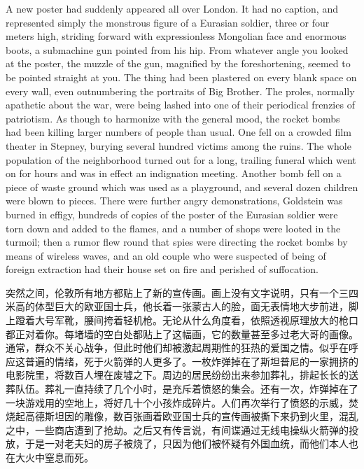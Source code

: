 \begin{paracol}{2}
A new poster had suddenly appeared all over London. It had no caption,
and represented simply the monstrous figure of a Eurasian soldier, three
or four meters high, striding forward with expressionless Mongolian face
and enormous boots, a submachine gun pointed from his hip. From whatever
angle you looked at the poster, the muzzle of the gun, magnified by the
foreshortening, seemed to be pointed straight at you. The thing had been
plastered on every blank space on every wall, even outnumbering the
portraits of Big Brother. The proles, normally apathetic about the war,
were being lashed into one of their periodical frenzies of patriotism.
As though to harmonize with the general mood, the rocket bombs had been
killing larger numbers of people than usual. One fell on a crowded film
theater in Stepney, burying several hundred victims among the ruins. The
whole population of the neighborhood turned out for a long, trailing
funeral which went on for hours and was in effect an indignation
meeting. Another bomb fell on a piece of waste ground which was used as
a playground, and several dozen children were blown to pieces. There
were further angry demonstrations, Goldstein was burned in effigy,
hundreds of copies of the poster of the Eurasian soldier were torn down
and added to the flames, and a number of shops were looted in the
turmoil; then a rumor flew round that spies were directing the rocket
bombs by means of wireless waves, and an old couple who were suspected
of being of foreign extraction had their house set on fire and perished
of suffocation.

\switchcolumn

突然之间，伦敦所有地方都贴上了新的宣传画。画上没有文字说明，只有一个三四米高的体型巨大的欧亚国士兵，他长着一张蒙古人的脸，面无表情地大步前进，脚上蹬着大号军靴，腰间挎着轻机枪。无论从什么角度看，依照透视原理放大的枪口都正对着你。每堵墙的空白处都贴上了这幅画，它的数量甚至多过老大哥的画像。通常，群众不关心战争，但此时他们却被激起周期性的狂热的爱国之情。似乎在呼应这普遍的情绪，死于火箭弹的人更多了。一枚炸弹掉在了斯坦普尼的一家拥挤的电影院里，将数百人埋在废墟之下。周边的居民纷纷出来参加葬礼，排起长长的送葬队伍。葬礼一直持续了几个小时，是充斥着愤怒的集会。还有一次，炸弹掉在了一块游戏用的空地上，将好几十个小孩炸成碎片。人们再次举行了愤怒的示威，焚烧起高德斯坦因的雕像，数百张画着欧亚国士兵的宣传画被撕下来扔到火里，混乱之中，一些商店遭到了抢劫。之后又有传言说，有间谍通过无线电操纵火箭弹的投放，于是一对老夫妇的房子被烧了，只因为他们被怀疑有外国血统，而他们本人也在大火中窒息而死。

\switchcolumn*


\end{paracol}
